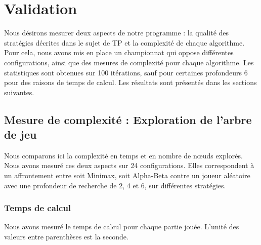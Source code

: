 \chapter{Validation}
\label{ch:validation}
Nous désirons mesurer deux aspects de notre programme : la qualité des stratégies décrites dans le sujet de \ac{TP} et la complexité de chaque algorithme. Pour cela, nous avons mis en place un championnat qui oppose différentes configurations, ainsi que des mesures de complexité pour chaque algorithme. Les statistiques sont obtenues sur 100 itérations, sauf pour certaines profondeurs 6 pour des raisons de temps de calcul. Les résultats sont présentés dans les sections suivantes.


\section{Mesure de complexité : Exploration de l'arbre de jeu}
\label{sec:game_tree_exploration}
Nous comparons ici la complexité en temps et en nombre de nœuds explorés. Nous avons mesuré ces deux aspects sur 24 configurations. Elles correspondent à un affrontement entre soit Minimax, soit Alpha-Beta contre un joueur aléatoire avec une profondeur de recherche de 2, 4 et 6, sur différentes stratégies.

\subsection*{Temps de calcul}
Nous avons mesuré le temps de calcul pour chaque partie jouée. L'unité des valeurs entre parenthèses est la seconde.


